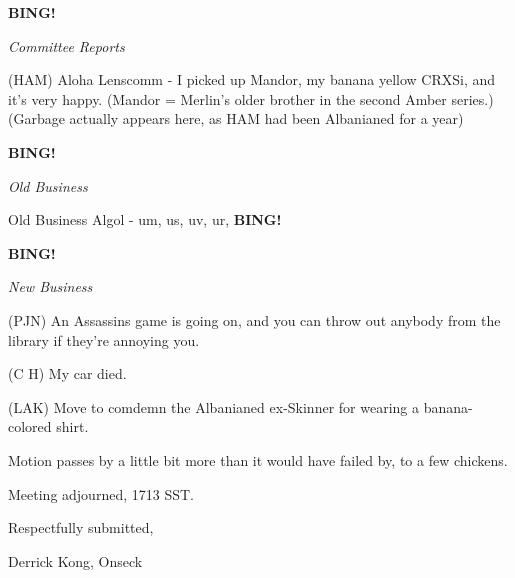 \documentclass[12pt]{article}
\newcommand{\bing}{{\bf BING!} }
\newcommand{\goto}[1]{\bing \vskip 12pt \centerline{{\em{#1}}}}
\begin{document}
\goto{Committee Reports}

(HAM) Aloha Lenscomm - I picked up Mandor, my banana yellow CRXSi, and it's very happy. (Mandor = Merlin's older brother in the second Amber series.) (Garbage actually appears here, as HAM had been Albanianed for a year)

\goto{Old Business}

Old Business Algol - um, us, uv, ur, \bing  

\goto{New Business}

(PJN) An Assassins game is going on, and you can throw out anybody from the library if they're annoying you.

(C H) My car died.

(LAK) Move to comdemn the Albanianed ex-Skinner for wearing a banana-colored shirt.

Motion passes by a little bit more than it would have failed by, to a few chickens.

\vspace{12pt}

\noindent
Meeting adjourned, 1713 SST.

\vspace{18pt}

\centerline{Respectfully submitted,}
\centerline{Derrick Kong, Onseck}
\end{document}
